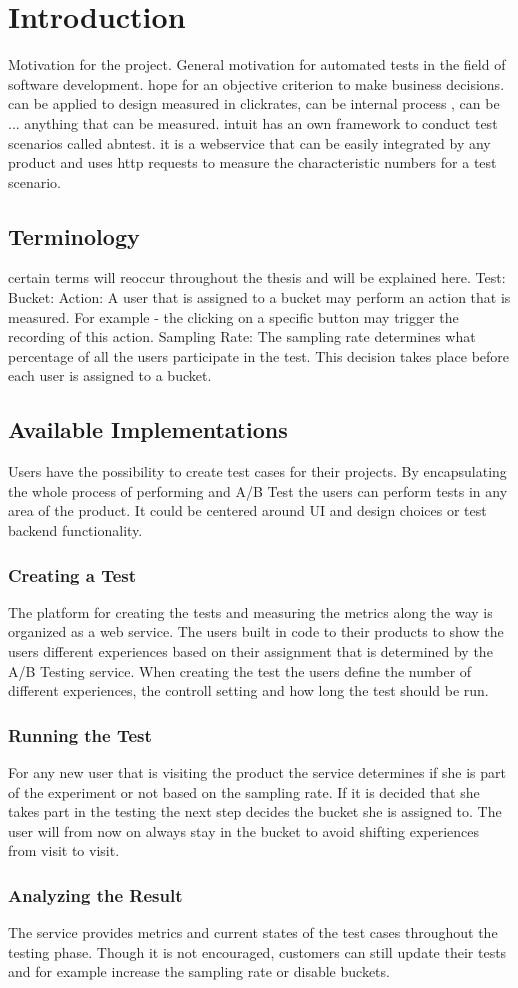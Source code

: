 \documentclass[main.tex]{subfiles}
\begin{document}
\chapter{Introduction}
Motivation for the project. General motivation for automated tests in the field of software development. hope for an objective criterion to make business decisions. can be applied to design measured in clickrates, can be internal process , can be ... anything that can be measured. intuit has an own framework to conduct test scenarios called abntest. it is a webservice that can be easily integrated by any product and uses http requests to measure the characteristic numbers for a test scenario.
\section{Terminology}
certain terms will reoccur throughout the thesis and will be explained here.
Test:
Bucket:
Action: A user that is assigned to a bucket may perform an action that is measured. For example - the clicking on a specific button may trigger the recording of this action. 
Sampling Rate: The sampling rate determines what percentage of all the users participate in the test. This decision takes place before each user is assigned to a bucket.
\section{Available Implementations}
Users have the possibility to create test cases for their projects. By encapsulating the whole process of performing and A/B Test the users can perform tests in any area of the product. It could be centered around UI and design choices or test backend functionality.
\subsection{Creating a Test} 
The platform for creating the tests and measuring the metrics along the way is organized as a web service. The users built in code to their products to show the users different experiences based on their assignment that is determined by the A/B Testing service. When creating the test the users define the number of different experiences, the controll setting and how long the test should be run.
\subsection{Running the Test}
For any new user that is visiting the product the service determines if she is part of the experiment or not based on the sampling rate. If it is decided that she takes part in the testing the next step decides the bucket she is assigned to. The user will from now on always stay in the bucket to avoid shifting experiences from visit to visit.
\subsection{Analyzing the Result}
The service provides metrics and current states of the test cases throughout the testing phase. Though it is not encouraged, customers can still update their tests and for example increase the sampling rate or disable buckets.
\end{document}
